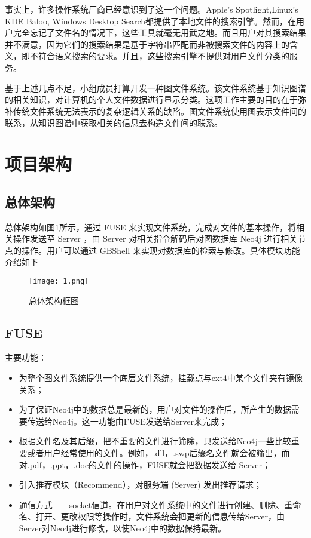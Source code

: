 \documentclass[UTF8]{ctexart}
\begin{document}
事实上，许多操作系统厂商已经意识到了这一个问题。Apple’s Spotlight,Linux’s KDE Baloo, Windows Desktop Search都提供了本地文件的搜索引擎。然而，在用户完全忘记了文件名的情况下，这些工具就毫无用武之地。而且用户对其搜索结果并不满意，因为它们的搜索结果是基于字符串匹配而非被搜索文件的内容上的含义，即不符合语义搜索的要求。并且，这些搜索引擎不提供对用户文件分类的服务。

基于上述几点不足，小组成员打算开发一种图文件系统。该文件系统基于知识图谱的相关知识，对计算机的个人文件数据进行显示分类。这项工作主要的目的在于弥补传统文件系统无法表示的复杂逻辑关系的缺陷。图文件系统使用图表示文件间的联系，从知识图谱中获取相关的信息去构造文件间的联系。

\section{项目架构}
\subsection{总体架构}
总体架构如图1所示，通过 FUSE 来实现文件系统，完成对文件的基本操作，将相关操作发送至 Server ，由 Server 对相关指令解码后对图数据库 Neo4j 进行相关节点的操作。用户可以通过 GBShell 来实现对数据库的检索与修改。具体模块功能介绍如下

\begin{figure}
\centering\texttt{[image: 1.png]}
\caption{总体架构框图}
\end{figure}

\subsection{FUSE}
主要功能：
\begin{itemize}
  \item 为整个图文件系统提供一个底层文件系统，挂载点与ext4中某个文件夹有镜像关系；
  \item 为了保证Neo4j中的数据总是最新的，用户对文件的操作后，所产生的数据需要传送给Neo4j。这一功能由FUSE发送给Server来完成；
\item 根据文件名及其后缀，把不重要的文件进行筛除，只发送给Neo4j一些比较重要或者用户经常使用的文件。例如，.dll，.swp后缀名文件就会被筛出，而对.pdf，.ppt，.doc的文件的操作，FUSE就会把数据发送给 Server；
	\item 引入推荐模块（Recommend），对服务端 (Server) 发出推荐请求；
\item 通信方式——socket信道。在用户对文件系统中的文件进行创建、删除、重命名、打开、更改权限等操作时，文件系统会把更新的信息传给Server，由Server对Neo4j进行修改，以使Neo4j中的数据保持最新。
\end{itemize}
\end{document}
